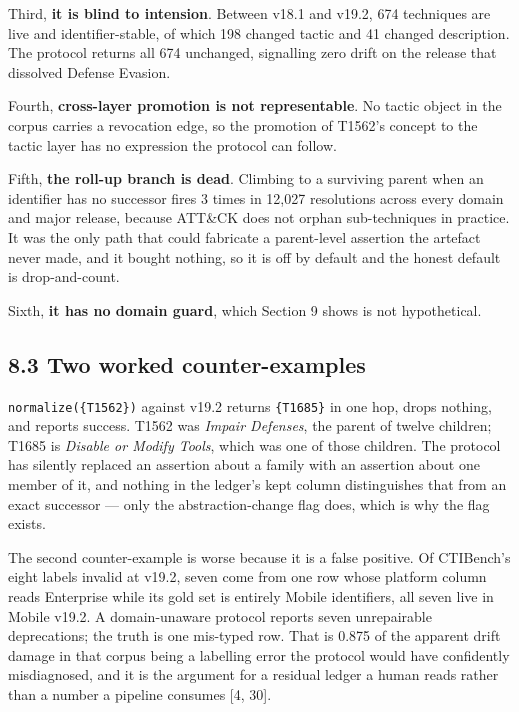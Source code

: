 \documentclass[11pt,a4paper]{article}
\begin{document}
Third, \textbf{it is blind to intension}. Between v18.1 and v19.2, 674 techniques are live and identifier-stable, of which 198 changed tactic and 41 changed description. The protocol returns all 674 unchanged, signalling zero drift on the release that dissolved Defense Evasion.

Fourth, \textbf{cross-layer promotion is not representable}. No tactic object in the corpus carries a revocation edge, so the promotion of T1562's concept to the tactic layer has no expression the protocol can follow.

Fifth, \textbf{the roll-up branch is dead}. Climbing to a surviving parent when an identifier has no successor fires 3 times in 12,027 resolutions across every domain and major release, because ATT\&CK does not orphan sub-techniques in practice. It was the only path that could fabricate a parent-level assertion the artefact never made, and it bought nothing, so it is off by default and the honest default is drop-and-count.

Sixth, \textbf{it has no domain guard}, which Section 9 shows is not hypothetical.

\subsection{8.3 Two worked counter-examples}

\texttt{normalize(\{T1562\})} against v19.2 returns \texttt{\{T1685\}} in one hop, drops nothing, and reports success. T1562 was \emph{Impair Defenses}, the parent of twelve children; T1685 is \emph{Disable or Modify Tools}, which was one of those children. The protocol has silently replaced an assertion about a family with an assertion about one member of it, and nothing in the ledger's kept column distinguishes that from an exact successor — only the abstraction-change flag does, which is why the flag exists.

The second counter-example is worse because it is a false positive. Of CTIBench's eight labels invalid at v19.2, seven come from one row whose platform column reads Enterprise while its gold set is entirely Mobile identifiers, all seven live in Mobile v19.2. A domain-unaware protocol reports seven unrepairable deprecations; the truth is one mis-typed row. That is 0.875 of the apparent drift damage in that corpus being a labelling error the protocol would have confidently misdiagnosed, and it is the argument for a residual ledger a human reads rather than a number a pipeline consumes [4, 30].
\end{document}
